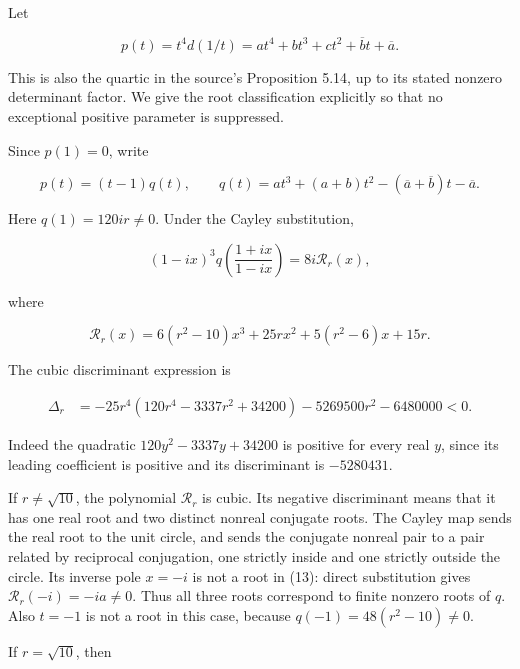 \documentclass[10pt,a4paper]{article}
\begin{document}
Let

\nopagebreak[4]

\[
p(t)=t^4d(1/t)
=at^4+bt^3+ct^2+\overline b t+\overline a.
\tag{12}
\]

This is also the quartic in the source's Proposition 5.14, up to its
stated nonzero determinant factor. We give the root classification
explicitly so that no exceptional positive parameter is suppressed.

Since \(p(1)=0\), write

\nopagebreak[4]

\[
p(t)=(t-1)q(t),\qquad
q(t)=at^3+(a+b)t^2-(\overline a+\overline b)t-\overline a.
\]

Here \(q(1)=120ir\ne0\). Under the Cayley substitution,

\nopagebreak[4]

\[
(1-ix)^3q\!\left(\frac{1+ix}{1-ix}\right)=8i\mathcal R_r(x),
\tag{13}
\]

where

\nopagebreak[4]

\[
\mathcal R_r(x)=6(r^2-10)x^3+25rx^2+5(r^2-6)x+15r.
\]


The cubic discriminant expression is

\nopagebreak[4]

\[
\begin{aligned}
\Delta_r
&=-25r^4(120r^4-3337r^2+34200)
  -5269500r^2-6480000<0.
\end{aligned}
\tag{14}
\]

Indeed the quadratic \(120y^2-3337y+34200\) is positive for every real
\(y\), since its leading coefficient is positive and its discriminant is
\(-5280431\).

If \(r\ne\sqrt{10}\), the polynomial \(\mathcal R_r\) is cubic. Its
negative discriminant means that it has one real root and two distinct
nonreal conjugate roots. The Cayley map sends the real root to the unit
circle, and sends the conjugate nonreal pair to a pair related by
reciprocal conjugation, one strictly inside and one strictly outside the
circle. Its inverse pole \(x=-i\) is not a root in (13): direct
substitution gives \(\mathcal R_r(-i)=-ia\ne0\). Thus all three roots
correspond to finite nonzero roots of \(q\). Also \(t=-1\) is not a root
in this case, because \(q(-1)=48(r^2-10)\ne0\).


If \(r=\sqrt{10}\), then

\nopagebreak[4]
\end{document}
